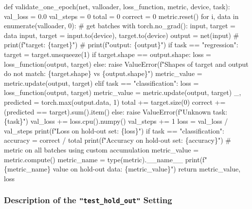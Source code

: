 \documentclass[
  letterpaper,
  DIV=11,
  numbers=noendperiod]{scrreprt}
\newenvironment{Shaded}{\begin{snugshade}}{\end{snugshade}}
\newcommand{\NormalTok}[1]{\textcolor[rgb]{0.00,0.23,0.31}{#1}}
\begin{document}
\begin{Shaded}
\begin{Highlighting}[]
\NormalTok{def validate\_one\_epoch(net, valloader, loss\_function, metric, device, task):}
\NormalTok{    val\_loss = 0.0}
\NormalTok{    val\_steps = 0}
\NormalTok{    total = 0}
\NormalTok{    correct = 0}
\NormalTok{    metric.reset()}
\NormalTok{    for i, data in enumerate(valloader, 0):}
\NormalTok{        \# get batches}
\NormalTok{        with torch.no\_grad():}
\NormalTok{            input, target = data}
\NormalTok{            input, target = input.to(device), target.to(device)}
\NormalTok{            output = net(input)}
\NormalTok{            \# print(f"target: \{target\}")}
\NormalTok{            \# print(f"output: \{output\}")}
\NormalTok{            if task == "regression":}
\NormalTok{                target = target.unsqueeze(1)}
\NormalTok{                if target.shape == output.shape:}
\NormalTok{                    loss = loss\_function(output, target)}
\NormalTok{                else:}
\NormalTok{                    raise ValueError(f"Shapes of target and output }
\NormalTok{                        do not match: \{target.shape\} vs \{output.shape\}")}
\NormalTok{                metric\_value = metric.update(output, target)}
\NormalTok{            elif task == "classification":}
\NormalTok{                loss = loss\_function(output, target)}
\NormalTok{                metric\_value = metric.update(output, target)}
\NormalTok{                \_, predicted = torch.max(output.data, 1)}
\NormalTok{                total += target.size(0)}
\NormalTok{                correct += (predicted == target).sum().item()}
\NormalTok{            else:}
\NormalTok{                raise ValueError(f"Unknown task: \{task\}")}
\NormalTok{            val\_loss += loss.cpu().numpy()}
\NormalTok{            val\_steps += 1}
\NormalTok{    loss = val\_loss / val\_steps}
\NormalTok{    print(f"Loss on hold{-}out set: \{loss\}")}
\NormalTok{    if task == "classification":}
\NormalTok{        accuracy = correct / total}
\NormalTok{        print(f"Accuracy on hold{-}out set: \{accuracy\}")}
\NormalTok{    \# metric on all batches using custom accumulation}
\NormalTok{    metric\_value = metric.compute()}
\NormalTok{    metric\_name = type(metric).\_\_name\_\_}
\NormalTok{    print(f"\{metric\_name\} value on hold{-}out data: \{metric\_value\}")}
\NormalTok{    return metric\_value, loss}
\end{Highlighting}
\end{Shaded}

\subsubsection{\texorpdfstring{Description of the
\texttt{"test\_hold\_out"}
Setting}{Description of the "test\_hold\_out" Setting}}\label{description-of-the-test_hold_out-setting}
\end{document}

